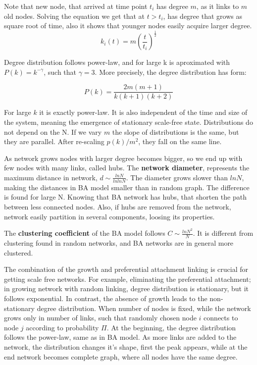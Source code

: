 Note that new node, that arrived at time point $t_i$ has degree $m$, as it links to $m$ old nodes. Solving the equation we get that at $t>t_i$, has degree that grows as square root of time, also it shows that younger nodes easily acquire larger degree. 
\begin{equation}
k_i(t) = m \left(\frac{t}{t_i}\right)^{\frac{1}{2}}
\end{equation}


Degree distribution follows power-law, and for large k is aproximated with $P(k) = k^{-\gamma}$, such that $\gamma=3$. More precisely, the degree distribution has form:

\begin{equation}
P(k) = \frac{2m(m+1)}{k(k+1)(k+2)}
\end{equation}

For large $k$ it is exactly power-law. It is also independent of the time and size of the system, meaning the emergence of stationary scale-free state. Distributions do not depend on the N. If we vary $m$ the slope of distributions is the same, but they are parallel. After re-scaling $p(k)/m^2$, they fall on the same line. 




As network grows nodes with larger degree becomes bigger, so we end up with few nodes with many links, called hubs. The \textbf{network diameter}, represents the maximum distance in network, $d \sim \frac{lnN}{lnlnN}$. The diameter grows slower than $lnN$, making the distances in BA model smaller than in random graph. The difference is found for large N. Knowing that BA network has hubs, that shorten the path between less connected nodes. Also, if hubs are removed from the network, network easily partition in several components, loosing its  properties. 

The \textbf{clustering coefficient} of the BA model follows $C \sim \frac{ln N^2}{N}$. It is different from clustering found in random networks, and BA networks are in general more clustered. 

The combination of the growth and preferential attachment linking is crucial for getting scale free networks. For example, eliminating the preferential attachment; in growing network with random linking, degree distribution is stationary, but it follows exponential. In contrast, the absence of growth leads to the non-stationary degree distribution. When number of nodes is fixed, while the network grows only in number of links, such that randomly chosen node $i$ connects to node $j$ according to probability $\Pi$. At the beginning, the degree distribution follows the power-law, same as in BA model. As more links are added to the network, the distribution changes it's shape, first the peak appears, while at the end network becomes complete graph, where all nodes have the same degree.  

